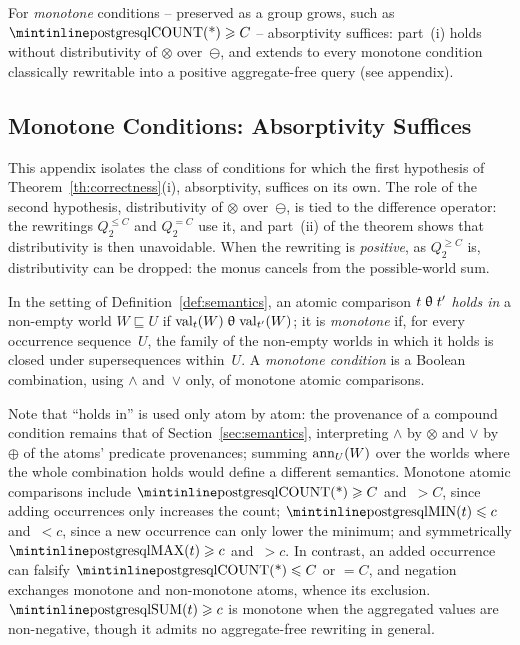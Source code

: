 For \emph{monotone}  conditions -- preserved as a group
grows, such as $\text{\sql{COUNT(*)}}\geq C$ -- absorptivity
suffices: part~(i) holds without distributivity of $\otimes$
over~$\ominus$, and extends to every monotone condition classically
rewritable into a positive aggregate-free query (see appendix).

\begin{toappendix}
\subsection{Monotone Conditions: Absorptivity Suffices}
\label{appendix:monotone}

This appendix isolates the class of  conditions for which
the first hypothesis of Theorem~\ref{th:correctness}(i), absorptivity,
suffices on its own. The role of the second hypothesis, distributivity
of $\otimes$ over~$\ominus$, is tied to the difference operator: the
rewritings $Q^{\leq C}_2$ and $Q^{=C}_2$ use it, and part~(ii) of the
theorem shows that distributivity is then unavoidable. When the
rewriting is \emph{positive}, as $Q^{\geq C}_2$ is, distributivity can
be dropped: the monus cancels from the possible-world sum.

\begin{definition}\label{def:monotone}
  In the setting of Definition~\ref{def:semantics}, an atomic
  comparison $t\mathrel{\uptheta} t'$ \emph{holds in} a non-empty world
  $W\sqsubseteq U$ if $\mathrm{val}_t(W)\mathrel{\uptheta}\mathrm{val}_{t'}(W)$; it
  is \emph{monotone} if, for every occurrence sequence~$U$, the family
  of the non-empty worlds in which it holds is closed under
  supersequences within~$U$. A \emph{monotone condition} is a Boolean
  combination, using $\land$ and~$\lor$ only, of monotone atomic
  comparisons.
\end{definition}
Note that ``holds in'' is used only atom by atom: the provenance of a
compound condition remains that of Section~\ref{sec:semantics},
interpreting $\land$ by $\otimes$ and $\lor$ by $\oplus$ of the
atoms' predicate provenances; summing $\mathrm{ann}_U(W)$ over the worlds
where the whole combination holds would define a different
semantics.
Monotone atomic comparisons include $\text{\sql{COUNT(*)}}\geq C$
and~$>C$, since adding occurrences only increases the count;
$\text{\sql{MIN}}(t)\leq c$ and~$<c$, since a new occurrence can only
lower the minimum; and symmetrically $\text{\sql{MAX}}(t)\geq c$
and~$>c$. In contrast, an added occurrence can falsify
$\text{\sql{COUNT(*)}}\leq C$ or $=C$, and negation exchanges
monotone and non-monotone atoms, whence its exclusion.
$\text{\sql{SUM}}(t)\geq c$ is monotone when the aggregated values
are non-negative, though it admits no aggregate-free rewriting in
general.


\end{toappendix}
